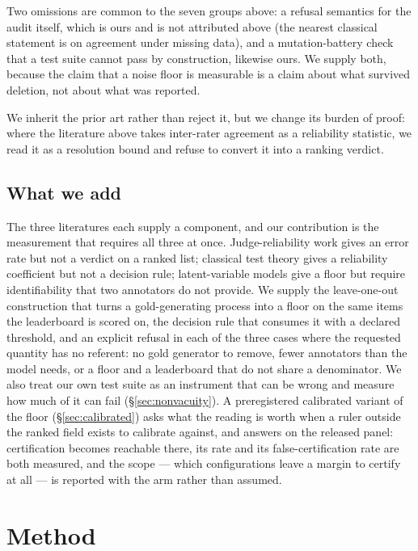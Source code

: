 \documentclass{article}
\begin{document}
Two omissions are common to the seven groups above: a refusal semantics for the audit itself, which is ours and is not attributed above (the nearest classical statement is \cite{krippendorff2004} on agreement under missing data), and a mutation-battery check that a test suite cannot pass by construction, likewise ours. We supply both, because the claim that a noise floor is measurable is a claim about what survived deletion, not about what was reported.

We inherit the prior art rather than reject it, but we change its burden of proof: where the literature above takes inter-rater agreement as a reliability statistic, we read it as a resolution bound and refuse to convert it into a ranking verdict.


\subsection{What we add}

The three literatures each supply a component, and our contribution is the
measurement that requires all three at once. Judge-reliability work gives an
error rate but not a verdict on a ranked list; classical test theory gives a
reliability coefficient but not a decision rule; latent-variable models give a
floor but require identifiability that two annotators do not provide. We
supply the leave-one-out construction that turns a gold-generating process
into a floor on the same items the leaderboard is scored on, the decision rule
that consumes it with a declared threshold, and an explicit refusal in each of
the three cases where the requested quantity has no referent: no gold
generator to remove, fewer annotators than the model needs, or a floor and a
leaderboard that do not share a denominator. We also treat our own test suite
as an instrument that can be wrong and measure how much of it can fail
(\S\ref{sec:nonvacuity}). A preregistered calibrated variant of the floor
(\S\ref{sec:calibrated}) asks what the reading is worth when a ruler outside the
ranked field exists to calibrate against, and answers on the released panel:
certification becomes reachable there, its rate and its false-certification rate
are both measured, and the scope --- which configurations leave a margin to
certify at all --- is reported with the arm rather than assumed.

\section{Method}
\label{sec:method}
\end{document}
